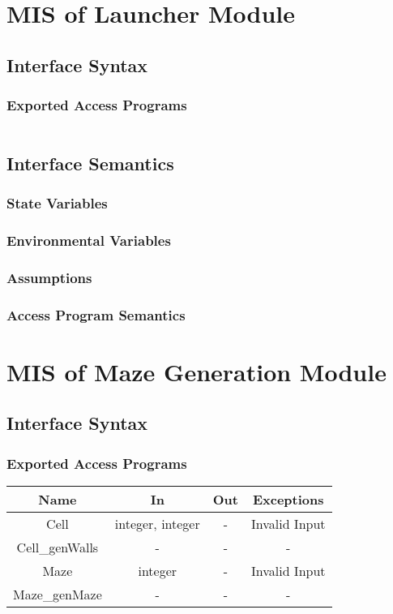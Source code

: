 \documentclass[12pt, titlepage]{article}
\begin{document}
\section{MIS of Launcher Module}
		\subsection{Interface Syntax}
		\subsubsection{Exported Access Programs}
		\begin{tabular}[pos]{|c|c|c|c|}
		\end{tabular}
		
		\subsection{Interface Semantics}
		\subsubsection{State Variables}
		
		\subsubsection{Environmental Variables}
		
		\subsubsection{Assumptions}
		
		\subsubsection{Access Program Semantics}
	
	
	
\section{MIS of Maze Generation Module}
		\subsection{Interface Syntax}
		\subsubsection{Exported Access Programs}
		\begin{tabular}[pos]{|c|c|c|c|}
			\hline
			\textbf{Name}& \textbf{In} & \textbf{Out} & \textbf{Exceptions} \\ \hline
			Cell & integer, integer & - & Invalid Input \\ \hline
			Cell\_genWalls & - & - & - \\ \hline
			Maze & integer & - & Invalid Input \\ \hline
			Maze\_genMaze & - & - & - \\ \hline
		\end{tabular}
		
\end{document}
